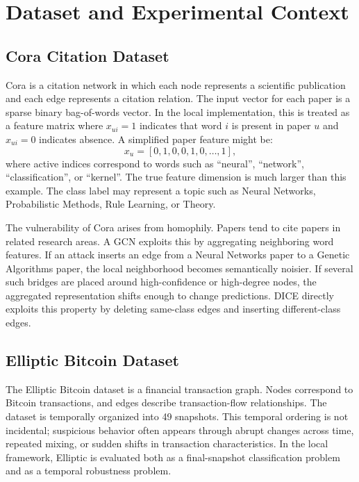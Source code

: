 \documentclass[12pt,oneside]{report}
\begin{document}
\chapter{Dataset and Experimental Context}

\section{Cora Citation Dataset}
Cora is a citation network in which each node represents a scientific publication and each edge represents a citation relation. The input vector for each paper is a sparse binary bag-of-words vector. In the local implementation, this is treated as a feature matrix where $x_{ui}=1$ indicates that word $i$ is present in paper $u$ and $x_{ui}=0$ indicates absence. A simplified paper feature might be:
$$
x_u=[0,1,0,0,1,0,\ldots,1],
$$
where active indices correspond to words such as ``neural'', ``network'', ``classification'', or ``kernel''. The true feature dimension is much larger than this example. The class label may represent a topic such as Neural Networks, Probabilistic Methods, Rule Learning, or Theory.

The vulnerability of Cora arises from homophily. Papers tend to cite papers in related research areas. A GCN exploits this by aggregating neighboring word features. If an attack inserts an edge from a Neural Networks paper to a Genetic Algorithms paper, the local neighborhood becomes semantically noisier. If several such bridges are placed around high-confidence or high-degree nodes, the aggregated representation shifts enough to change predictions. DICE directly exploits this property by deleting same-class edges and inserting different-class edges.

\section{Elliptic Bitcoin Dataset}
The Elliptic Bitcoin dataset is a financial transaction graph. Nodes correspond to Bitcoin transactions, and edges describe transaction-flow relationships. The dataset is temporally organized into 49 snapshots. This temporal ordering is not incidental; suspicious behavior often appears through abrupt changes across time, repeated mixing, or sudden shifts in transaction characteristics. In the local framework, Elliptic is evaluated both as a final-snapshot classification problem and as a temporal robustness problem.
\end{document}
